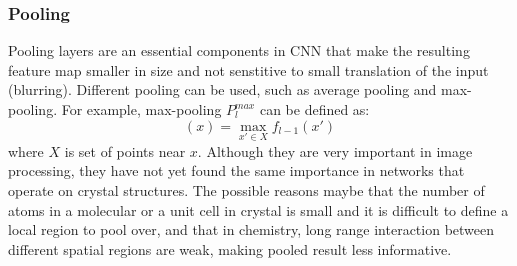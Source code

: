 \documentclass{IEEEtran}
\begin{document}
\subsubsection*{Pooling}
Pooling layers are an essential components in CNN that make the resulting feature map smaller in size 
and not senstitive to small translation of the input (blurring). 
Different pooling can be 
used, such as average pooling and max-pooling. For example, max-pooling $P^{max}_l$ can be defined as:
\begin{equation}
    [P^{max}_l \circ f_{l-1}] (x) = \max_{x' \in X} f_{l-1}(x')
\end{equation}
where $X$ is set of points near $x$. 
Although they are very 
important in image processing, they have not yet found the same importance in networks that 
operate on crystal structures. The possible reasons maybe that the number of atoms in a molecular or 
a unit cell in crystal is small and it is difficult to define a local region to pool over, and 
that in chemistry, long range interaction between different spatial regions are weak, making pooled 
result less informative.  
\end{document}
